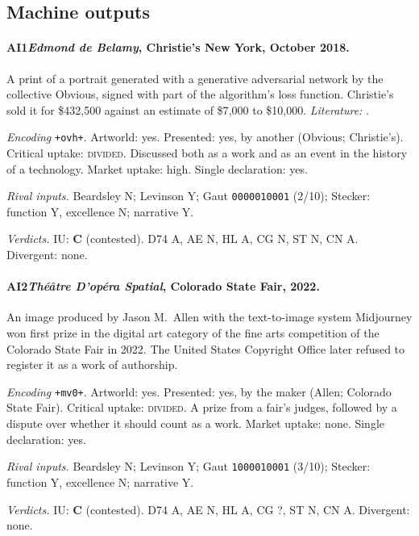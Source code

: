 \subsection{Machine outputs}

\paragraph{AI1\enspace \emph{Edmond de Belamy}, Christie's New York, October 2018.}
A print of a portrait generated with a generative adversarial network by the collective Obvious, signed with part of the algorithm's loss function. Christie's sold it for \$432{,}500 against an estimate of \$7{,}000 to \$10{,}000. \textit{Literature:} \citet{Hertzmann2018}.\par
\noindent\textit{Encoding} \texttt{+ovh+}. Artworld: yes. Presented: yes, by another (Obvious; Christie's). Critical uptake: \textsc{divided}. Discussed both as a work and as an event in the history of a technology. Market uptake: high. Single declaration: yes.\par
\noindent\textit{Rival inputs.} Beardsley N; Levinson Y; Gaut \texttt{0000010001} (2/10); Stecker: function Y, excellence N; narrative Y.\par
\noindent\textit{Verdicts.} IU: \textbf{C} (contested). D74 A, AE N, HL A, CG N, ST N, CN A. Divergent: none.\par

\paragraph{AI2\enspace \emph{Th\'e\^atre D'op\'era Spatial}, Colorado State Fair, 2022.}
An image produced by Jason M.~Allen with the text-to-image system Midjourney won first prize in the digital art category of the fine arts competition of the Colorado State Fair in 2022. The United States Copyright Office later refused to register it as a work of authorship.\par
\noindent\textit{Encoding} \texttt{+mv0+}. Artworld: yes. Presented: yes, by the maker (Allen; Colorado State Fair). Critical uptake: \textsc{divided}. A prize from a fair's judges, followed by a dispute over whether it should count as a work. Market uptake: none. Single declaration: yes.\par
\noindent\textit{Rival inputs.} Beardsley N; Levinson Y; Gaut \texttt{1000010001} (3/10); Stecker: function Y, excellence N; narrative Y.\par
\noindent\textit{Verdicts.} IU: \textbf{C} (contested). D74 A, AE N, HL A, CG ?, ST N, CN A. Divergent: none.\par

